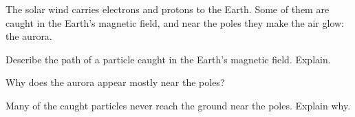 The solar wind carries electrons and protons to the Earth. Some of them are caught in the Earth's magnetic field, and near the poles they make the air glow: the aurora.

\begin{abcliste}
\abc Describe the path of a particle caught in the Earth's magnetic field. Explain.

\abc Why does the aurora appear mostly near the poles?

\abc Many of the caught particles never reach the ground near the poles. Explain why.
\end{abcliste}
